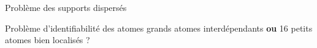 \begin{frame}{Problème des supports dispersés}
\begin{figure}\centering
\end{figure}
\begin{alertblock}{Problème d'identifiabilité des atomes} \alert{grands} atomes interdépendants \textbf{ou} 16 \alert{petits} atomes bien localisés ?
\end{alertblock}
\end{frame}

